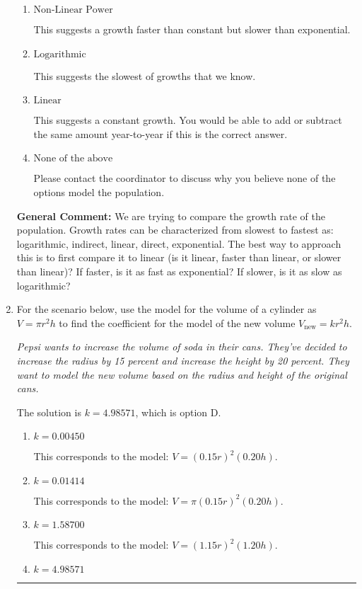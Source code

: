 \documentclass{extbook}[14pt]
\newcommand{\litem}[1]{\item #1

\rule{\textwidth}{0.4pt}}
\begin{document}
\begin{enumerate}
{\begin{enumerate}[label=\Alph*.]
This suggests the fastest of growths that we know.
\item \( \text{Non-Linear Power} \)

This suggests a growth faster than constant but slower than exponential.
\item \( \text{Logarithmic} \)

This suggests the slowest of growths that we know.
\item \( \text{Linear} \)

This suggests a constant growth. You would be able to add or subtract the same amount year-to-year if this is the correct answer.
\item \( \text{None of the above} \)

Please contact the coordinator to discuss why you believe none of the options model the population.
\end{enumerate}

\textbf{General Comment:} We are trying to compare the growth rate of the population. Growth rates can be characterized from slowest to fastest as: logarithmic, indirect, linear, direct, exponential. The best way to approach this is to first compare it to linear (is it linear, faster than linear, or slower than linear)? If faster, is it as fast as exponential? If slower, is it as slow as logarithmic?
}
\litem{
For the scenario below, use the model for the volume of a cylinder as $V = \pi r^2 h$ to find the coefficient for the model of the new volume $V_{\text{new}} = k r^2 h$.

\begin{center}
    \textit{ Pepsi wants to increase the volume of soda in their cans. They've decided to increase the radius by 15 percent and increase the height by 20 percent. They want to model the new volume based on the radius and height of the original cans. }
\end{center}
The solution is \( k = 4.98571 \), which is option D.\begin{enumerate}[label=\Alph*.]
\item \( k = 0.00450 \)

This corresponds to the model: $V = (0.15 r)^2 (0.20 h)$.
\item \( k = 0.01414 \)

This corresponds to the model: $V = \pi (0.15 r)^2 (0.20 h)$.
\item \( k = 1.58700 \)

This corresponds to the model: $V = (1.15 r)^2 (1.20 h)$.
\item \( k = 4.98571 \)


\end{enumerate}}
\end{enumerate}
\end{document}
